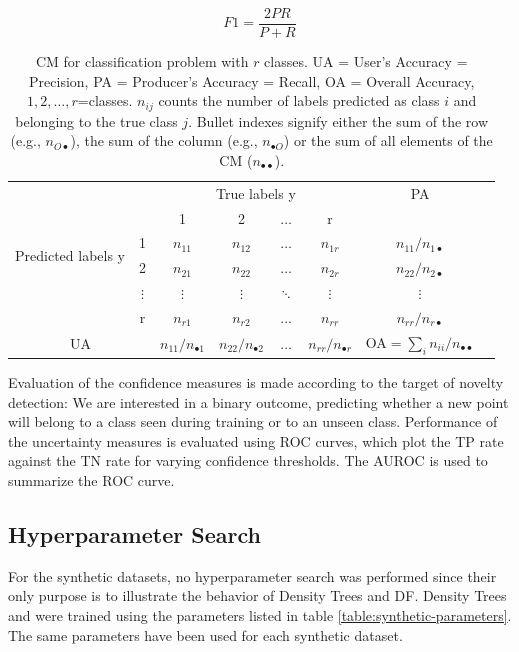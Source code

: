 \documentclass[10pt]{article}
\begin{document}
 \begin{equation}
F1=\frac{2PR}{P+R}
\end{equation}

\begin{table}[H]
	\centering
	\begin{tabular}{cc|c|c|c|c|cl}
		& & \multicolumn{4}{c|}{True labels y}&PA\\
		\multirow{4}{*}{Predicted labels y} &  & 1& 2& $\hdots$ &r  &\\ \cline{1-7} 
		& 1 &  $n_{11}$ & $n_{12}$ & $\hdots$ & $n_{1r}$& $n_{11}/n_{1\bullet}$ \\ \cline{2-7} 
		& 2 & $n_{21}$ & $n_{22}$ &$\hdots$  &$n_{2r}$ &$n_{22}/n_{2\bullet}$\\ \cline{2-7} 
		& $\vdots$ & $\vdots$ & $\vdots$ &$\ddots$  &$\vdots$&$\vdots$\\ \cline{2-7} 
		& r & $n_{r1}$ & $n_{r2}$ &$\hdots$  & $n_{rr}$ & $n_{rr}/n_{r\bullet}$ \\\cline{1-7} 
		\multicolumn{2}{c|}{UA} & $n_{11}/n_{\bullet 1}$ & $n_{22}/n_{\bullet 2}$ & $\hdots$ & $n_{rr}/n_{\bullet r}$ & OA$=\sum_in_{ii}/n_{\bullet\bullet}$\\
	\end{tabular}
	\caption{\acrlong{CM} for classification problem with $r$ classes. UA = User's Accuracy = Precision, PA = Producer's Accuracy = Recall, OA = Overall Accuracy, $1,2,\hdots,r$=classes. $n_{ij}$ counts the number of labels predicted as class $i$ and belonging to the true class $j$. Bullet indexes signify either the sum of the row (e.g., $n_{O\bullet}$), the sum of the column (e.g., $n_{\bullet O}$) or the sum of all elements of the \acrlong{CM} ($n_{\bullet\bullet}$).}
	\label{table:cm}
\end{table}

Evaluation of the confidence measures is made according to the target of novelty detection: We are interested in a binary outcome, predicting whether a new point will belong to a class seen during training or to an unseen class. Performance of the uncertainty measures is evaluated using \gls{ROC} curves, which plot the \gls{TP} rate against the \gls{TN} rate for varying confidence thresholds.  The \gls{AUROC} is used to summarize the \gls{ROC} curve.


\subsection{Hyperparameter Search}
\label{subsec:hyperparameter-search}
For the synthetic datasets, no hyperparameter search was performed since their only purpose is to illustrate the behavior of Density Trees and \acrlong{DF}. Density Trees and  were trained using the parameters listed in table \ref{table:synthetic-parameters}. The same parameters have been used for each synthetic dataset.
\end{document}
